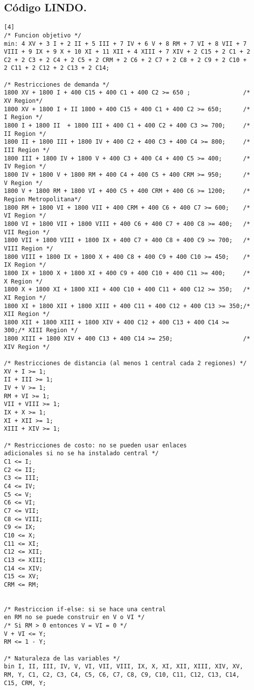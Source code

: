 \documentclass[12pt,letterpaper]{article}
\begin{document}
\subsection{Código LINDO.}
\begin{verbatim}[4]
/* Funcion objetivo */
min: 4 XV + 3 I + 2 II + 5 III + 7 IV + 6 V + 8 RM + 7 VI + 8 VII + 7 VIII + 9 IX + 9 X + 10 XI + 11 XII + 4 XIII + 7 XIV + 2 C15 + 2 C1 + 2 C2 + 2 C3 + 2 C4 + 2 C5 + 2 CRM + 2 C6 + 2 C7 + 2 C8 + 2 C9 + 2 C10 + 2 C11 + 2 C12 + 2 C13 + 2 C14;

/* Restricciones de demanda */
1800 XV + 1800 I + 400 C15 + 400 C1 + 400 C2 >= 650 ;				/* XV Region*/
1800 XV + 1800 I + II 1800 + 400 C15 + 400 C1 + 400 C2 >= 650;		/* I Region */
1800 I + 1800 II  + 1800 III + 400 C1 + 400 C2 + 400 C3 >= 700;		/* II Region */
1800 II + 1800 III + 1800 IV + 400 C2 + 400 C3 + 400 C4 >= 800;		/* III Region */
1800 III + 1800 IV + 1800 V + 400 C3 + 400 C4 + 400 C5 >= 400;		/* IV Region */
1800 IV + 1800 V + 1800 RM + 400 C4 + 400 C5 + 400 CRM >= 950;		/* V Region */
1800 V + 1800 RM + 1800 VI + 400 C5 + 400 CRM + 400 C6 >= 1200;		/* Region Metropolitana*/
1800 RM + 1800 VI + 1800 VII + 400 CRM + 400 C6 + 400 C7 >= 600;	/* VI Region */
1800 VI + 1800 VII + 1800 VIII + 400 C6 + 400 C7 + 400 C8 >= 400;	/* VII Region */
1800 VII + 1800 VIII + 1800 IX + 400 C7 + 400 C8 + 400 C9 >= 700;	/* VIII Region */
1800 VIII + 1800 IX + 1800 X + 400 C8 + 400 C9 + 400 C10 >= 450;	/* IX Region */
1800 IX + 1800 X + 1800 XI + 400 C9 + 400 C10 + 400 C11 >= 400;		/* X Region */
1800 X + 1800 XI + 1800 XII + 400 C10 + 400 C11 + 400 C12 >= 350;	/* XI Region */
1800 XI + 1800 XII + 1800 XIII + 400 C11 + 400 C12 + 400 C13 >= 350;/* XII Region */
1800 XII + 1800 XIII + 1800 XIV + 400 C12 + 400 C13 + 400 C14 >= 300;/* XIII Region */
1800 XIII + 1800 XIV + 400 C13 + 400 C14 >= 250;					/* XIV Region */

/* Restricciones de distancia (al menos 1 central cada 2 regiones) */
XV + I >= 1;
II + III >= 1;
IV + V >= 1;
RM + VI >= 1;
VII + VIII >= 1;
IX + X >= 1;
XI + XII >= 1;
XIII + XIV >= 1;

/* Restricciones de costo: no se pueden usar enlaces
adicionales si no se ha instalado central */
C1 <= I;
C2 <= II;
C3 <= III;
C4 <= IV;
C5 <= V;
C6 <= VI;
C7 <= VII;
C8 <= VIII;
C9 <= IX;
C10 <= X;
C11 <= XI;
C12 <= XII;
C13 <= XIII;
C14 <= XIV;
C15 <= XV;
CRM <= RM;


/* Restriccion if-else: si se hace una central
en RM no se puede construir en V o VI */
/* Si RM > 0 entonces V = VI = 0 */
V + VI <= Y;
RM <= 1 - Y;

/* Naturaleza de las variables */
bin I, II, III, IV, V, VI, VII, VIII, IX, X, XI, XII, XIII, XIV, XV, RM, Y, C1, C2, C3, C4, C5, C6, C7, C8, C9, C10, C11, C12, C13, C14, C15, CRM, Y;
\end{verbatim}
\end{document}
